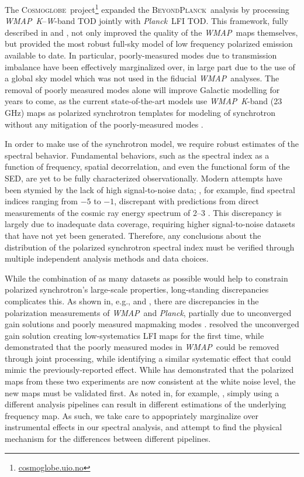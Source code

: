 \documentclass[twocolumn]{../../common/aa}
\def\WMAP{\emph{WMAP}}
\def\Planck{\emph{Planck}}
\newcommand{\bp}{\textsc{BeyondPlanck}}
\newcommand{\cosmoglobe}{\textsc{Cosmoglobe}}
\newcommand{\K}[0]{\textit K}
\newcommand{\W}[0]{\textit W}
\begin{document}
The \cosmoglobe\ project\footnote{\url{cosmoglobe.uio.no}} expanded the \bp\ analysis by processing \WMAP\ \K--\W-band TOD jointly with \Planck\ LFI TOD. This framework, fully described in \citet{bp17} and \cite{watts2023_dr1},
not only improved the quality of the \WMAP\ maps themselves, but provided the most robust full-sky model of low frequency polarized emission available to date. In particular, poorly-measured modes due to transmission imbalance \citep{jarosik2007} have been effectively marginalized over, in large part due to the use of a global sky model which was not used in the fiducial \WMAP\ analyses. The removal of poorly measured modes alone will improve Galactic modelling for years to come, as the current state-of-the-art models use \WMAP\ \K-band (23\,GHz) maps as polarized synchrotron templates for modeling of synchrotron without any mitigation of the poorly-measured modes \citep{delabrouille2012,pysm2,pysm3}.

In order to make use of the synchrotron model, we require robust estimates of the spectral behavior. Fundamental behaviors, such as the spectral index as a function of frequency, spatial decorrelation, and even the functional form of the SED, are yet to be fully characterized observationally. Modern attempts have been stymied by the lack of high signal-to-noise data; \citet{deBelsunce:2022}, for example, find spectral indices ranging from $-5$ to $-1$, discrepant with predictions from direct measurements of the cosmic ray energy spectrum of 2--3 \citep{rybicki,orlando2013,neronov2017}. This discrepancy is largely due to inadequate data coverage, requiring higher signal-to-noise datasets that have not yet been generated. Therefore, any conclusions about the distribution of the polarized synchrotron spectral index must be verified through multiple independent analysis methods and data choices.


While the combination of as many datasets as possible would help to constrain polarized synchrotron's large-scale properties, long-standing discrepancies complicates this. As shown in, e.g., \citet{planck2014-a12} and \citet{weiland:2018}, there are discrepancies in the polarization measurements of \WMAP\ and \Planck, partially due to unconverged gain solutions \citep{planck2016-l02} and poorly measured mapmaking modes \citep{bennett2012}. \citet{bp01} resolved the unconverged gain solution creating low-systematics LFI maps for the first time, while \citet{bp17} demonstrated that the poorly measured modes in \WMAP\ could be removed through joint processing, while identifying a similar systematic effect that could mimic the previously-reported effect.  While \citet{watts2023_dr1} has demonstrated that the polarized maps from these two experiments are now consistent at the white noise level, the new maps must be validated first. As noted in, for example, \citet{weiland:2022}, simply using a different analysis pipelines can result in different estimations of the underlying frequency map. As such, we take care to appopriately marginalize over instrumental effects in our spectral analysis, and attempt to find the physical mechanism for the differences between different pipelines.
\end{document}
